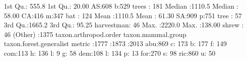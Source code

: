 \documentclass[11pt, a4paper]{article}
\begin{document}
\begin{Schunk}
\begin{Soutput}
 1st Qu.: 555.8   1st Qu.: 20.00   AS:608    b:529   trees     : 181  
 Median :1110.5   Median : 58.00   CA:416    m:347   bat       : 124  
 Mean   :1110.5   Mean   : 61.30   SA:909    p:751   tree      :  57  
 3rd Qu.:1665.2   3rd Qu.: 95.25                     harvestman:  46  
 Max.   :2220.0   Max.   :138.00                     shrew     :  46  
                                                     (Other)   :1375  
 taxon.arthropod.order taxon.mammal.group taxon.forest.generalist metric   
  :1777                 :1873              :2013                  abu:869  
 c: 173                b: 177             f: 149                  com:113  
 h: 136                l:   9             g:  58                  dem:108  
 l: 134                p:  13                                     for:270  
                       s:  98                                     ric:860  
                       u:  50                                              
                                                                           

\end{Soutput}
\end{Schunk}
\end{document}
